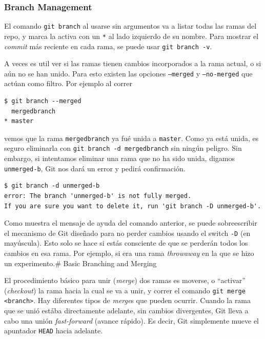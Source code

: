 \documentclass[spanish, 12pt, a4paper]{article}
\begin{document}
\subsubsection{Branch Management}

El comando \passthrough{\lstinline!git branch!} al usarse sin argumentos
va a listar todas las ramas del repo, y marca la activa con un
\passthrough{\lstinline!*!} al lado izquierdo de su nombre. Para mostrar
el \emph{commit} más reciente en cada rama, se puede usar
\passthrough{\lstinline!git branch -v!}.

A veces es util ver si las ramas tienen cambios incorporados a la rama
actual, o si aún no se han unido. Para esto existen las opciones
\passthrough{\lstinline!–merged!} y \passthrough{\lstinline!–no-merged!}
que actúan como filtro. Por ejemplo al correr

\begin{lstlisting}
$ git branch --merged
  mergedbranch
* master
\end{lstlisting}

vemos que la rama \passthrough{\lstinline!mergedbranch!} ya fué unida a
\passthrough{\lstinline!master!}. Como ya está unida, es seguro
eliminarla con \passthrough{\lstinline!git branch -d mergedbranch!} sin
ningún peligro. Sin embargo, si intentamos eliminar una rama que no ha
sido unida, digamos \passthrough{\lstinline!unmerged-b!}, Git nos dará
un error y pedirá confirmación.

\begin{lstlisting}
$ git branch -d unmerged-b
error: The branch 'unmerged-b' is not fully merged.
If you are sure you want to delete it, run 'git branch -D unmerged-b'.
\end{lstlisting}

Como muestra el mensaje de ayuda del comando anterior, se puede
sobreescribir el mecanismo de Git diseñado para no perder cambios usando
el switch \passthrough{\lstinline!-D!} (en mayúscula). Esto solo se hace
si estás consciente de que se perderán todos los cambios en esa rama.
Por ejemplo, si era una rama \emph{throwaway} en la que se hizo un
experimento.\# Basic Branching and Merging

El procedimiento básico para unir (\emph{merge}) dos ramas es moverse, o
``activar'' (\emph{checkout}) la rama hacia la cual se va a unir, y
correr el comando \passthrough{\lstinline!git merge <branch>!}. Hay
diferentes tipos de \emph{merge}s que pueden ocurrir. Cuando la rama que
se unió estába directamente adelante, sin cambios divergentes, Git lleva
a cabo una unión \emph{fast-forward} (avance rápido). Es decir, Git
simplemente mueve el apuntador \passthrough{\lstinline!HEAD!} hacia
adelante.
\end{document}
